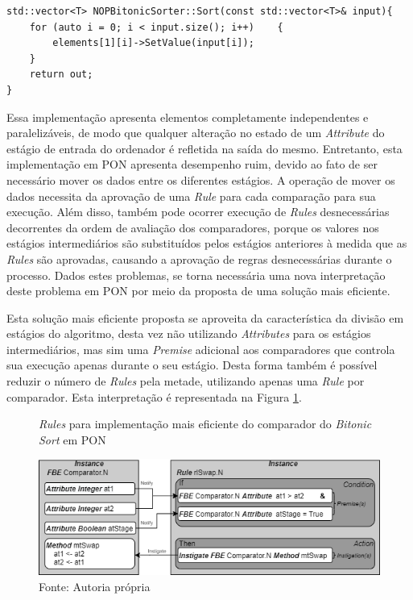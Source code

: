 \begin{lstlisting}[caption = {Trecho de código da estrutura NOPBitonicSorter},
  source = {Autoria própria}, float=htb,
  label = {cod:sort_function}]
std::vector<T> NOPBitonicSorter::Sort(const std::vector<T>& input){
    for (auto i = 0; i < input.size(); i++)    {
        elements[1][i]->SetValue(input[i]);
    }
    return out;
}
\end{lstlisting}

Essa implementação apresenta elementos completamente independentes e
paralelizáveis, de modo que qualquer alteração no estado de um
\textit{Attribute} do estágio de entrada do ordenador é refletida na saída do
mesmo. Entretanto, esta implementação em PON apresenta desempenho ruim, devido
ao fato de ser necessário mover os dados entre os diferentes estágios. A
operação de mover os dados necessita da aprovação de uma \textit{Rule} para cada
comparação para sua execução. Além disso, também pode ocorrer execução de
\textit{Rules} desnecessárias decorrentes da ordem de avaliação dos
comparadores, porque os valores nos estágios intermediários são substituídos
pelos estágios anteriores à medida que as \textit{Rules} são aprovadas,
causando a aprovação de regras desnecessárias durante o processo. Dados estes
problemas, se torna necessária uma nova interpretação deste problema em PON por
meio da proposta de uma solução mais eficiente.

Esta solução mais eficiente proposta se aproveita da característica da divisão
em estágios do algoritmo, desta vez não utilizando \textit{Attributes} para os
estágios intermediários, mas sim uma \textit{Premise} adicional aos comparadores
que controla sua execução apenas durante o seu estágio. Desta forma também é
possível reduzir o número de \textit{Rules} pela metade, utilizando apenas uma
\textit{Rule} por comparador. Esta interpretação é representada na Figura
\ref{fig:rule_bitonic_old}.

\begin{figure}[!htb]
\centering
\caption{\textit{Rules} para implementação mais eficiente do comparador do
\textit{Bitonic Sort} em PON}
\includegraphics[width=0.95 \textwidth]{../figures/nop_bitonic_old.png}
\smallskip
\caption*{Fonte: Autoria própria}
\label{fig:rule_bitonic_old}
\end{figure}

